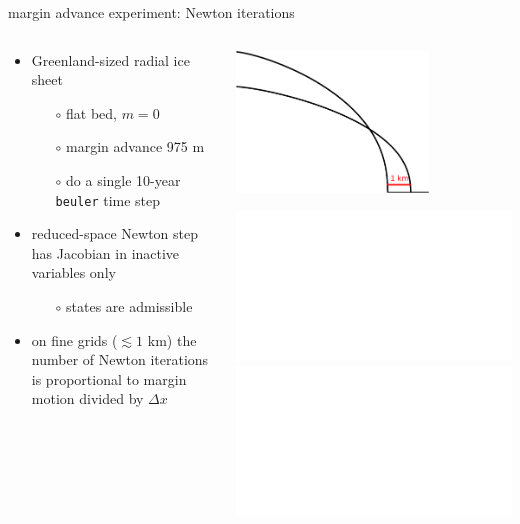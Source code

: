 \documentclass[hide notes,intlimits,usenames,dvipsnames]{beamer}
\begin{document}
\begin{frame}{margin advance experiment: Newton iterations}

\begin{columns}
\begin{column}{0.45\textwidth}
\begin{itemize}
\item Greenland-sized radial ice sheet
    \begin{itemize}
    \item[$\circ$] flat bed, $m=0$
    \item[$\circ$] margin advance 975 m
    \item[$\circ$] do a single 10-year \texttt{beuler} time step
    \end{itemize}
\item reduced-space Newton step has Jacobian in inactive variables only
    \begin{itemize}
    \item[$\circ$] states are admissible
    \end{itemize}
\item<2> on fine grids ($\lesssim 1$ km) the number of Newton iterations is proportional to margin motion divided by $\Delta x$
\end{itemize}\end{column}
\begin{column}{0.55\textwidth}

\bigskip
\hfill \includegraphics[width=0.7\textwidth]{halfarcartoon.pdf}

\bigskip
\includegraphics<1>[width=\textwidth]{newtoniters.pdf}
\includegraphics<2>[width=\textwidth]{newtonitersFIT.pdf}
\end{column}
\end{columns}
\end{frame}
\end{document}

